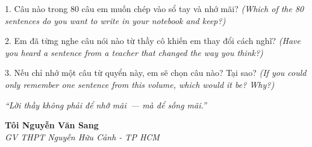 \begin{tuhocnhanh}
1. Câu nào trong 80 câu em muốn chép vào sổ tay và nhớ mãi? \textit{(Which of the 80 sentences do you want to write in your notebook and keep?)}

2. Em đã từng nghe câu nói nào từ thầy cô khiến em thay đổi cách nghĩ? \textit{(Have you heard a sentence from a teacher that changed the way you think?)}

3. Nếu chỉ nhớ một câu từ quyển này, em sẽ chọn câu nào? Tại sao? \textit{(If you could only remember one sentence from this volume, which would it be? Why?)}
\end{tuhocnhanh}

\begin{center}
\textit{\color{honeygold}``Lời thầy không phải để nhớ mãi~--- mà để sống mãi.''}
\end{center}

\begin{flushright}
\textbf{Tôi Nguyễn Văn Sang}\\
\textit{GV THPT Nguyễn Hữu Cảnh - TP HCM}
\end{flushright}

\ngancach
